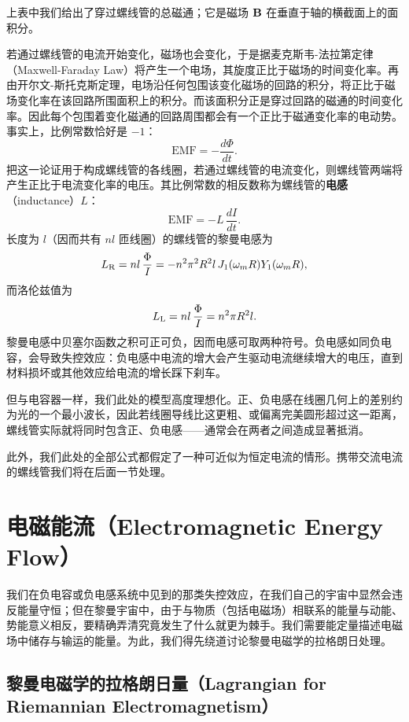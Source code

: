上表中我们给出了穿过螺线管的总磁通；它是磁场 $\mathbf{B}$ 在垂直于轴的横截面上的面积分。

若通过螺线管的电流开始变化，磁场也会变化，于是据麦克斯韦-法拉第定律（Maxwell-Faraday Law）将产生一个电场，其旋度正比于磁场的时间变化率。再由开尔文-斯托克斯定理，电场沿任何包围该变化磁场的回路的积分，将正比于磁场变化率在该回路所围面积上的积分。而该面积分正是穿过回路的磁通的时间变化率。因此每个包围着变化磁通的回路周围都会有一个正比于磁通变化率的电动势。事实上，比例常数恰好是 $-1$：
\[
\text{EMF} = -\frac{d\Phi}{dt}.
\]
把这一论证用于构成螺线管的各线圈，若通过螺线管的电流变化，则螺线管两端将产生正比于电流变化率的电压。其比例常数的相反数称为螺线管的\textbf{电感}（inductance）$L$：
\[
\text{EMF} = -L\,\frac{dI}{dt}.
\]
长度为 $l$（因而共有 $nl$ 匝线圈）的螺线管的黎曼电感为
\begin{equation}
L_{\mathrm{R}} = n l\,\frac{\Phi}{I} = -n^2 \pi^2 R^2 l\,J_1(\omega_m R) Y_1(\omega_m R),
\end{equation}
而洛伦兹值为
\begin{equation}
L_{\mathrm{L}} = n l\,\frac{\Phi}{I} = n^2 \pi R^2 l.
\end{equation}
黎曼电感中贝塞尔函数之积可正可负，因而电感可取两种符号。负电感如同负电容，会导致失控效应：负电感中电流的增大会产生驱动电流继续增大的电压，直到材料损坏或其他效应给电流的增长踩下刹车。

但与电容器一样，我们此处的模型高度理想化。正、负电感在线圈几何上的差别约为光的一个最小波长，因此若线圈导线比这更粗、或偏离完美圆形超过这一距离，螺线管实际就将同时包含正、负电感——通常会在两者之间造成显著抵消。

此外，我们此处的全部公式都假定了一种可近似为恒定电流的情形。携带交流电流的螺线管我们将在后面一节处理。

\section{电磁能流（Electromagnetic Energy Flow）}

我们在负电容或负电感系统中见到的那类失控效应，在我们自己的宇宙中显然会违反能量守恒；但在黎曼宇宙中，由于与物质（包括电磁场）相联系的能量与动能、势能意义相反，要精确弄清究竟发生了什么就更为棘手。我们需要能定量描述电磁场中储存与输运的能量。为此，我们得先绕道讨论黎曼电磁学的拉格朗日处理。

\subsection{黎曼电磁学的拉格朗日量（Lagrangian for Riemannian Electromagnetism）}

